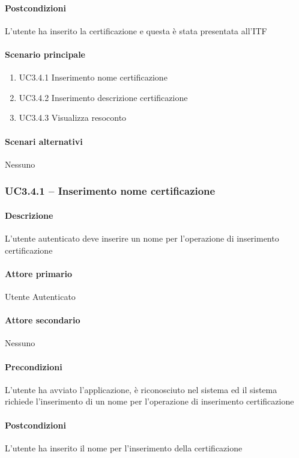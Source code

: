 \paragraph{Postcondizioni}  L’utente ha inserito la certificazione e questa è stata presentata all’ITF
\paragraph{Scenario principale}  
    \begin{enumerate}
        \item UC3.4.1 Inserimento nome certificazione
        \item UC3.4.2 Inserimento descrizione certificazione
        \item UC3.4.3 Visualizza resoconto
    \end{enumerate}
\paragraph{Scenari alternativi}  Nessuno



\subsubsection{UC3.4.1 – Inserimento nome certificazione}
\paragraph{Descrizione}  L’utente autenticato deve inserire un nome per l’operazione di inserimento certificazione
\paragraph{Attore primario}  Utente Autenticato
\paragraph{Attore secondario}  Nessuno
\paragraph{Precondizioni}  L’utente ha avviato l’applicazione, è riconosciuto nel sistema ed il sistema richiede l’inserimento di un nome per l’operazione di inserimento certificazione
\paragraph{Postcondizioni}  L’utente ha inserito il nome per l’inserimento della certificazione
